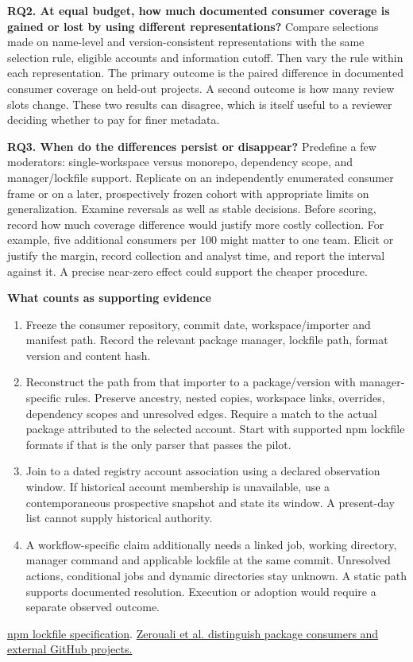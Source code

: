 \documentclass[11pt,a4paper]{article}
\newcommand{\hd}[1]{\par\textbf{\color{accent}#1}\par\nopagebreak}
\newcommand{\doi}[2]{\href{https://doi.org/#1}{#2}}
\begin{document}
\textbf{RQ2. At equal budget, how much documented consumer coverage is gained or lost by using different representations?} Compare selections made on name-level and version-consistent representations with the same selection rule, eligible accounts and information cutoff. Then vary the rule within each representation. The primary outcome is the paired difference in documented consumer coverage on held-out projects. A second outcome is how many review slots change. These two results can disagree, which is itself useful to a reviewer deciding whether to pay for finer metadata.

\textbf{RQ3. When do the differences persist or disappear?} Predefine a few moderators: single-workspace versus monorepo, dependency scope, and manager/lockfile support. Replicate on an independently enumerated consumer frame or on a later, prospectively frozen cohort with appropriate limits on generalization. Examine reversals as well as stable decisions. Before scoring, record how much coverage difference would justify more costly collection. For example, five additional consumers per 100 might matter to one team. Elicit or justify the margin, record collection and analyst time, and report the interval against it. A precise near-zero effect could support the cheaper procedure.

\hd{What counts as supporting evidence}
\begin{enumerate}
\item Freeze the consumer repository, commit date, workspace/importer and manifest path. Record the relevant package manager, lockfile path, format version and content hash.
\item Reconstruct the path from that importer to a package/version with manager-specific rules. Preserve ancestry, nested copies, workspace links, overrides, dependency scopes and unresolved edges. Require a match to the actual package attributed to the selected account. Start with supported npm lockfile formats if that is the only parser that passes the pilot.
\item Join to a dated registry account association using a declared observation window. If historical account membership is unavailable, use a contemporaneous prospective snapshot and state its window. A present-day list cannot supply historical authority.
\item A workflow-specific claim additionally needs a linked job, working directory, manager command and applicable lockfile at the same commit. Unresolved actions, conditional jobs and dynamic directories stay unknown. A static path supports documented resolution. Execution or adoption would require a separate observed outcome.
\end{enumerate}
\href{https://docs.npmjs.com/cli/v11/configuring-npm/package-lock-json/}{npm lockfile specification}. \doi{10.1007/s10664-022-10154-1}{Zerouali et al. distinguish package consumers and external GitHub projects.}
\end{document}
